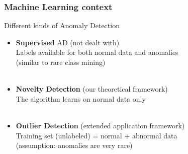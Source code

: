 \documentclass[9pt]{beamer}
\newcommand\red{\color{red} }
\begin{document}
\begin{frame}
\frametitle{Machine Learning context}
\begin{block}{Different kinds of Anomaly Detection}
\begin{itemize}
\item \textbf{Supervised} AD {\red (not dealt with)}\\
Labels available for both normal data and anomalies\\
(similar to rare class mining)\\~\\

\item \textbf{Novelty Detection} {\red (our theoretical framework)}\\
The algorithm learns on normal data only\\~\\

\item \textbf{Outlier Detection} {\red (extended application framework)}\\
Training set (unlabeled) = normal + abnormal data \\
(assumption: anomalies are very rare)
\end{itemize}
\end{block}
\end{frame}
\end{document}
